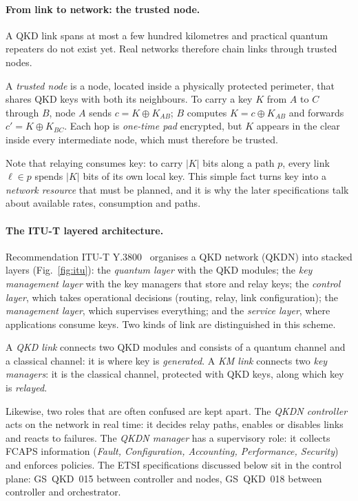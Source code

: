\paragraph{From link to network: the trusted node.}
A QKD link spans at most a few hundred kilometres and practical quantum
repeaters do not exist yet. Real networks therefore chain links through
trusted nodes.

\begin{definition}
A \emph{trusted node} is a node, located inside a physically protected
perimeter, that shares QKD keys with both its neighbours. To carry a key
$K$ from $A$ to $C$ through $B$, node $A$ sends $c = K \oplus K_{AB}$; $B$
computes $K = c \oplus K_{AB}$ and forwards $c' = K \oplus K_{BC}$. Each hop
is \emph{one-time pad} encrypted, but $K$ appears in the clear inside every
intermediate node, which must therefore be trusted.
\end{definition}

Note that relaying consumes key: to carry $|K|$ bits along a path $p$, every
link $\ell\in p$ spends $|K|$ bits of its own local key. This simple fact
turns key into a \emph{network resource} that must be planned, and it is why
the later specifications talk about available rates, consumption and paths.

\paragraph{The ITU-T layered architecture.}
Recommendation ITU-T Y.3800~\cite{ituy3800} organises a QKD network (QKDN)
into stacked layers (Fig.~\ref{fig:itu}): the \emph{quantum layer} with
the QKD modules; the \emph{key management layer} with the key managers that
store and relay keys; the \emph{control layer}, which takes operational
decisions (routing, relay, link configuration); the \emph{management
layer}, which supervises everything; and the \emph{service layer}, where
applications consume keys. Two kinds of link are distinguished in this
scheme.

\begin{definition}
A \emph{QKD link} connects two QKD modules and consists of a quantum
channel and a classical channel: it is where key is \emph{generated}. A
\emph{KM link} connects two \emph{key managers}: it is the classical
channel, protected with QKD keys, along which key is \emph{relayed}.
\end{definition}

Likewise, two roles that are often confused are kept apart. The \emph{QKDN
controller} acts on the network in real time: it decides relay paths,
enables or disables links and reacts to failures. The \emph{QKDN manager}
has a supervisory role: it collects FCAPS information (\emph{Fault,
Configuration, Accounting, Performance, Security}) and enforces policies.
The ETSI specifications discussed below sit in the control plane:
GS~QKD~015 between controller and nodes, GS~QKD~018 between controller and
orchestrator.

